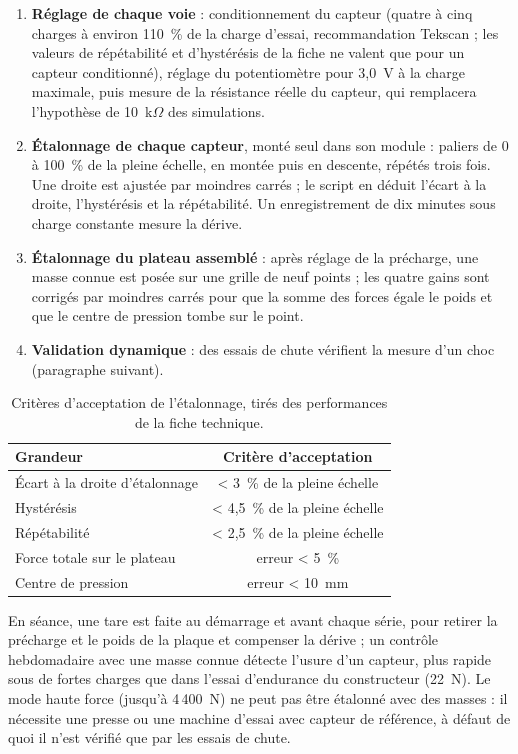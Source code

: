 \begin{enumerate}
  \item \textbf{Réglage de chaque voie} : conditionnement du capteur (quatre à cinq charges à environ 110~\% de la charge d'essai, recommandation Tekscan ; les valeurs de répétabilité et d'hystérésis de la fiche ne valent que pour un capteur conditionné), réglage du potentiomètre pour 3,0~V à la charge maximale, puis mesure de la résistance réelle du capteur, qui remplacera l'hypothèse de 10~k$\Omega$ des simulations.
  \item \textbf{Étalonnage de chaque capteur}, monté seul dans son module : paliers de 0 à 100~\% de la pleine échelle, en montée puis en descente, répétés trois fois. Une droite est ajustée par moindres carrés ; le script en déduit l'écart à la droite, l'hystérésis et la répétabilité. Un enregistrement de dix minutes sous charge constante mesure la dérive.
  \item \textbf{Étalonnage du plateau assemblé} : après réglage de la précharge, une masse connue est posée sur une grille de neuf points ; les quatre gains sont corrigés par moindres carrés pour que la somme des forces égale le poids et que le centre de pression tombe sur le point.
  \item \textbf{Validation dynamique} : des essais de chute vérifient la mesure d'un choc (paragraphe suivant).
\end{enumerate}

\begin{table}[H]
\centering
\begin{tabular}{@{}lc@{}}
\toprule
\textbf{Grandeur} & \textbf{Critère d'acceptation} \\
\midrule
Écart à la droite d'étalonnage & < 3~\% de la pleine échelle \\
Hystérésis & < 4,5~\% de la pleine échelle \\
Répétabilité & < 2,5~\% de la pleine échelle \\
Force totale sur le plateau & erreur < 5~\% \\
Centre de pression & erreur < 10~mm \\
\bottomrule
\end{tabular}
\caption{Critères d'acceptation de l'étalonnage, tirés des performances de la fiche technique.}
\end{table}

En séance, une tare est faite au démarrage et avant chaque série, pour retirer la précharge et le poids de la plaque et compenser la dérive ; un contrôle hebdomadaire avec une masse connue détecte l'usure d'un capteur, plus rapide sous de fortes charges que dans l'essai d'endurance du constructeur (22~N). Le mode haute force (jusqu'à 4\,400~N) ne peut pas être étalonné avec des masses : il nécessite une presse ou une machine d'essai avec capteur de référence, à défaut de quoi il n'est vérifié que par les essais de chute.

